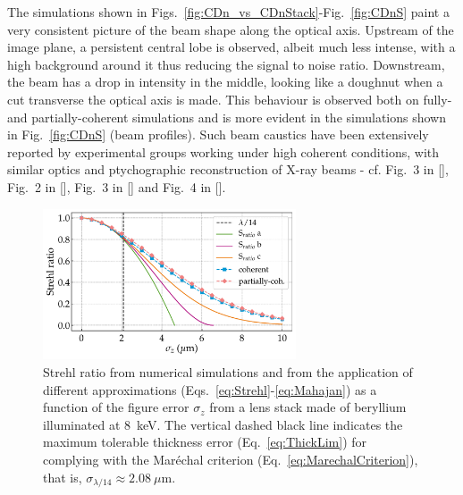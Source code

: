 \begin{refsection}
The simulations shown in Figs.~\ref{fig:CDn_vs_CDnStack}-Fig.~\ref{fig:CDnS} paint a very consistent picture of the beam shape along the optical axis. Upstream of the image plane, a persistent central lobe is observed, albeit much less intense, with a high background around it thus reducing the signal to noise ratio. Downstream, the beam has a drop in intensity in the middle, looking like a doughnut when a cut transverse the optical axis is made. This behaviour is observed both on fully- and partially-coherent simulations and is more evident in the simulations shown in Fig.~\ref{fig:CDnS} (beam profiles). Such beam caustics have been extensively reported by experimental groups working under high coherent conditions, with similar optics and ptychographic reconstruction of X-ray beams - cf. Fig.~3 in [\cite{Schropp2013}], Fig.~2 in [\cite{Seiboth2016}], Fig.~3 in [\cite{Gasilov2017}] and Fig.~4 in [\cite{Seiboth2020}].

\begin{figure}[t]
    \centering
    \includegraphics[width=7.5cm]{figures/ch05/fig_10.pdf} %
    \caption[Strehl ratio from numerical simulations]{Strehl ratio from numerical simulations and from the application of different approximations (Eqs.~\ref{eq:Strehl}-\ref{eq:Mahajan}) as a function of the figure error $\sigma_z$ from a lens stack made of beryllium illuminated at 8~keV. The vertical dashed black line indicates the maximum tolerable thickness error (Eq.~\ref{eq:ThickLim}) for complying with the Mar\'echal criterion (Eq.~\ref{eq:MarechalCriterion}), that is, $\sigma_{\lambda/14}\approx2.08~\mu\text{m}$.}
    \label{fig:Strehl}
\end{figure}{}


\end{refsection}
